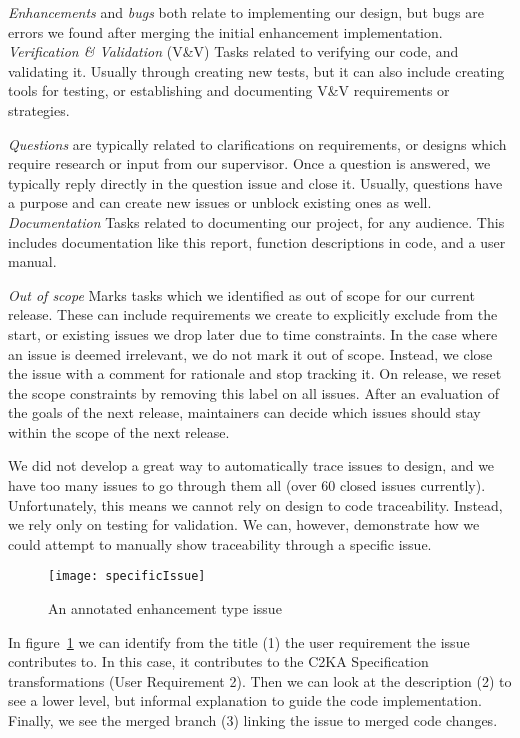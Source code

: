 \textit{Enhancements} and \textit{bugs} both relate to implementing our design,
but bugs are errors we found after merging the initial enhancement implementation.
\textit{Verification \& Validation} (V\&V) Tasks related to verifying our code, and validating it.
Usually through creating new tests, but it can also include creating tools for testing,
or establishing and documenting V\&V requirements or strategies.

\textit{Questions} are typically related to clarifications on requirements,
or designs which require research or input from our supervisor.
Once a question is answered, we typically reply directly in the question issue and close it.
Usually, questions have a purpose and can create new issues or unblock existing ones as well.
\textit{Documentation} Tasks related to documenting our project, for any audience.
This includes documentation like this report, function descriptions in code, and a user manual.

\textit{Out of scope} Marks tasks which we identified as out of scope for our current release.
These can include requirements we create to explicitly exclude from the start,
or existing issues we drop later due to time constraints.
In the case where an issue is deemed irrelevant, we do not mark it out of scope.
Instead, we close the issue with a comment for rationale and stop tracking it.
On release, we reset the scope constraints by removing this label on all issues.
After an evaluation of the goals of the next release,
maintainers can decide which issues should stay within the scope of the next release.

We did not develop a great way to automatically trace issues to design,
and we have too many issues to go through them all (over 60 closed issues currently).
Unfortunately, this means we cannot rely on design to code traceability.
Instead, we rely only on testing for validation.
We can, however, demonstrate how we could attempt to manually show traceability through a specific issue.
\begin{figure}[h]
    \centering
    \texttt{[image: specificIssue]}
    \caption{An annotated enhancement type issue}
    \label{fig:specificIssue}
\end{figure}
In figure~\ref{fig:specificIssue} we can identify from the title (1) the user requirement the issue contributes to.
In this case, it contributes to the C2KA Specification transformations (User Requirement 2).
Then we can look at the description (2) to see a lower level, but informal explanation to guide the code implementation.
Finally, we see the merged branch (3) linking the issue to merged code changes.

